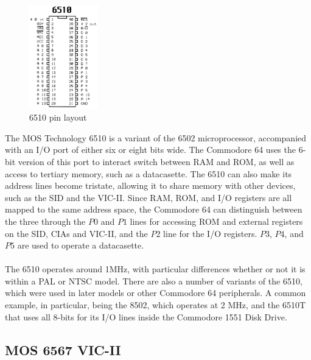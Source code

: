 \documentclass{article}
\begin{document}
\paragraph{}
\begin{figure}
\vspace{-20pt}
\begin{center}
\includegraphics[width=3cm]{6510}
\caption{6510 pin layout}
\end{center}
\end{figure}
The MOS Technology 6510 is a variant of the 6502 microprocessor, accompanied with an I/O port of either six or eight bits wide. The Commodore 64 uses the 6-bit version of this port to interact switch between RAM and ROM, as well as access to tertiary memory, such as a datacasette. The 6510 can also make its address lines become tristate, allowing it to share memory with other devices, such as the SID and the VIC-II. Since RAM, ROM, and I/O registers are all mapped to the same address space, the Commodore 64 can distinguish between the three through the $P0$ and $P1$ lines for accessing ROM and external registers on the SID, CIAs and VIC-II, and the $P2$ line for the I/O registers. $P3$, $P4$, and $P5$ are used to operate a datacasette.

\paragraph{}
The 6510 operates around 1MHz, with particular differences whether or not it is within a PAL or NTSC model. There are also a number of variants of the 6510, which were used in later models or other Commodore 64 peripherals. A common example, in particular, being the 8502, which operates at 2 MHz, and the 6510T that uses all 8-bits for its I/O lines inside the Commodore 1551 Disk Drive.

\subsection{MOS 6567 VIC-II}
\end{document}
